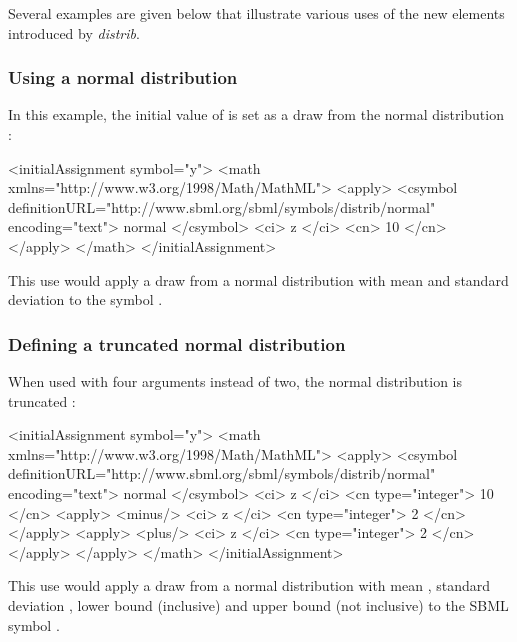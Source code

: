 \documentclass[draftspec]{sbmlpkgspec}
\newcommand{\distribshort}{\emph{distrib}\xspace}
\begin{document}
Several examples are given below that illustrate various uses of the new  elements introduced by \distribshort.

\subsubsection{Using a normal distribution}

In this example, the initial value of  is set as a draw from the normal distribution :

\begin{example}
  <initialAssignment symbol="y">
    <math xmlns="http://www.w3.org/1998/Math/MathML">
      <apply>
        <csymbol definitionURL="http://www.sbml.org/sbml/symbols/distrib/normal"
                 encoding="text"> normal </csymbol>
        <ci> z </ci>
        <cn> 10 </cn>
      </apply>
    </math>
  </initialAssignment>
\end{example}

This use would apply a draw from a normal distribution with mean  and standard deviation  to the symbol .

\subsubsection{Defining a truncated normal distribution}

When used with four arguments instead of two, the normal distribution is truncated :

\begin{example}
  <initialAssignment symbol="y">
    <math xmlns="http://www.w3.org/1998/Math/MathML">
      <apply>
        <csymbol definitionURL="http://www.sbml.org/sbml/symbols/distrib/normal"
                 encoding="text"> normal </csymbol>
        <ci> z </ci>
        <cn type="integer"> 10 </cn>
        <apply>
          <minus/>
          <ci> z </ci>
          <cn type="integer"> 2 </cn>
        </apply>
        <apply>
          <plus/>
          <ci> z </ci>
          <cn type="integer"> 2 </cn>
        </apply>
      </apply>
    </math>
  </initialAssignment>
\end{example}

This use would apply a draw from a normal distribution with mean , standard deviation , lower bound  (inclusive) and upper bound  (not inclusive) to the SBML symbol .
\end{document}
